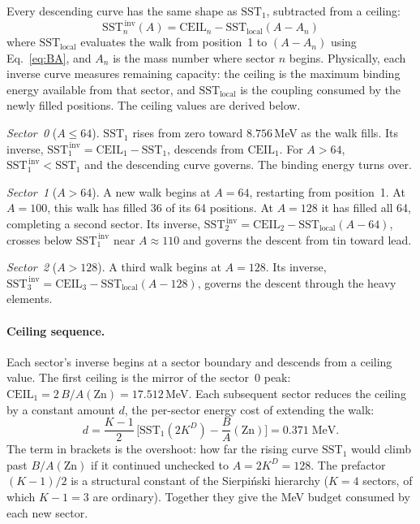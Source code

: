 \documentclass[fleqn,usenatbib]{mnras}
\begin{document}
Every descending curve has the same shape as $\mathrm{SST}_1$, subtracted from a ceiling:
\begin{equation}
\mathrm{SST}_{n}^{\,\mathrm{inv}}(A) = \mathrm{CEIL}_n - \mathrm{SST}_{\mathrm{local}}(A - A_n)
\end{equation}
where $\mathrm{SST}_{\mathrm{local}}$ evaluates the walk from position~1 to $(A - A_n)$ using Eq.~\ref{eq:BA}, and $A_n$ is the mass number where sector $n$ begins. Physically, each inverse curve measures remaining capacity: the ceiling is the maximum binding energy available from that sector, and $\mathrm{SST}_{\mathrm{local}}$ is the coupling consumed by the newly filled positions. The ceiling values are derived below.

\emph{Sector~0} ($A \leq 64$). $\mathrm{SST}_1$ rises from zero toward $8.756$\,MeV as the walk fills. Its inverse, $\mathrm{SST}_1^{\,\mathrm{inv}} = \mathrm{CEIL}_1 - \mathrm{SST}_1$, descends from $\mathrm{CEIL}_1$. For $A > 64$, $\mathrm{SST}_1^{\,\mathrm{inv}} < \mathrm{SST}_1$ and the descending curve governs. The binding energy turns over.

\emph{Sector~1} ($A > 64$). A new walk begins at $A = 64$, restarting from position~1. At $A = 100$, this walk has filled 36 of its 64 positions. At $A = 128$ it has filled all 64, completing a second sector. Its inverse, $\mathrm{SST}_2^{\,\mathrm{inv}} = \mathrm{CEIL}_2 - \mathrm{SST}_{\mathrm{local}}(A - 64)$, crosses below $\mathrm{SST}_1^{\,\mathrm{inv}}$ near $A \approx 110$ and governs the descent from tin toward lead.

\emph{Sector~2} ($A > 128$). A third walk begins at $A = 128$. Its inverse, $\mathrm{SST}_3^{\,\mathrm{inv}} = \mathrm{CEIL}_3 - \mathrm{SST}_{\mathrm{local}}(A - 128)$, governs the descent through the heavy elements.

\paragraph{Ceiling sequence.}
Each sector's inverse begins at a sector boundary and descends from a ceiling value. The first ceiling is the mirror of the sector~0 peak: $\mathrm{CEIL}_1 = 2\,B/A(\mathrm{Zn}) = 17.512$\,MeV. Each subsequent sector reduces the ceiling by a constant amount $d$, the per-sector energy cost of extending the walk:
\begin{equation}
d = \frac{K-1}{2}\,\Big[\mathrm{SST}_1(2K^D) - \frac{B}{A}(\mathrm{Zn})\Big] = 0.371\;\mathrm{MeV}.
\label{eq:sectordrop}
\end{equation}
The term in brackets is the overshoot: how far the rising curve $\mathrm{SST}_1$ would climb past $B/A(\mathrm{Zn})$ if it continued unchecked to $A = 2K^D = 128$. The prefactor $(K{-}1)/2$ is a structural constant of the Sierpi\'nski hierarchy ($K = 4$ sectors, of which $K{-}1 = 3$ are ordinary). Together they give the MeV budget consumed by each new sector.
\end{document}
